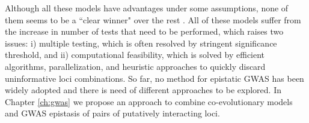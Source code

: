 Although all these models have advantages under some assumptions, none of them seems to be a ``clear winner" over the rest \cite{cordell2009detecting}. All of these models suffer from the increase in number of tests that need to be performed, which raises two issues: i) multiple testing, which is often resolved by stringent significance threshold, and ii) computational feasibility, which is solved by efficient algorithms, parallelization, and heuristic approaches to quickly discard uninformative loci combinations. So far, no method for epistatic GWAS has been widely adopted and there is need of different approaches to be explored. In Chapter \ref{ch:gwas} we propose an approach to combine co-evolutionary models and GWAS epistasis of pairs of putatively interacting loci.

%
%
